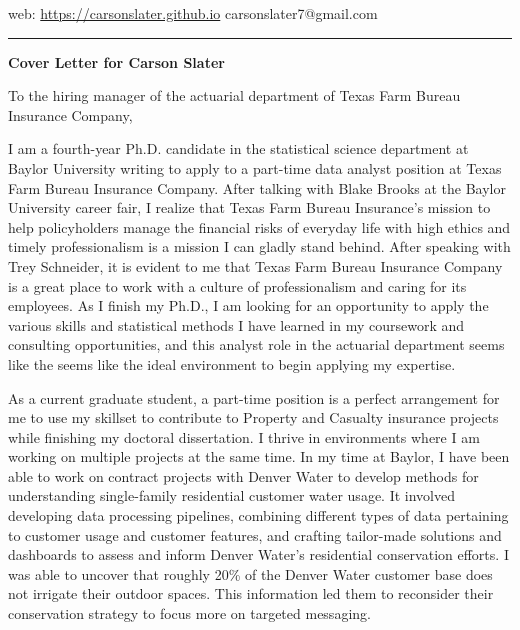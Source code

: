 \documentclass[11pt]{article}
\begin{document}
\noindent
web: \href{https://carsonslater.github.io}{https://carsonslater.github.io} \hfill carsonslater7@gmail.com \\
\rule{\textwidth}{0.4pt}

\vspace{2em}

\begin{center}
    \Large \textbf{Cover Letter for Carson Slater}
\end{center}

\vspace{1em}

\noindent
To the hiring manager of the actuarial department of Texas Farm Bureau Insurance Company,

\vspace{1em}


\small
I am a fourth-year Ph.D. candidate in the statistical science department at Baylor University writing to apply to a part-time data analyst position at Texas Farm Bureau Insurance Company. After talking with Blake Brooks at the Baylor University career fair, I realize that Texas Farm Bureau Insurance's mission to help policyholders manage the financial risks of everyday life with high ethics and timely professionalism is a mission I can gladly stand behind. After speaking with Trey Schneider, it is evident to me that Texas Farm Bureau Insurance Company is a great place to work with a culture of professionalism and caring for its employees. As I finish my Ph.D., I am looking for an opportunity to apply the various skills and statistical methods I have learned in my coursework and consulting opportunities, and this analyst role in the actuarial department seems like the seems like the ideal environment to begin applying my expertise.

As a current graduate student, a part-time position is a perfect arrangement for me to use my skillset to contribute to Property and Casualty insurance projects while finishing my doctoral dissertation. I thrive in environments where I am working on multiple projects at the same time. In my time at Baylor, I have been able to work on contract projects with Denver Water to develop methods for understanding single-family residential customer water usage. It involved developing data processing pipelines, combining different types of data pertaining to customer usage and customer features, and crafting tailor-made solutions and dashboards to assess and inform Denver Water's residential conservation efforts. I was able to uncover that roughly 20\% of the Denver Water customer base does not irrigate their outdoor spaces. This information led them to reconsider their conservation strategy to focus more on targeted messaging.
\end{document}

